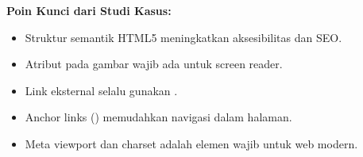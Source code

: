 \begin{catatan}
\textbf{Poin Kunci dari Studi Kasus:}
\begin{itemize}[leftmargin=*]
  \item Struktur semantik HTML5 meningkatkan aksesibilitas dan SEO.
  \item Atribut  pada gambar wajib ada untuk screen reader.
  \item Link eksternal selalu gunakan .
  \item Anchor links () memudahkan navigasi dalam halaman.
  \item Meta viewport dan charset adalah elemen wajib untuk web modern.
\end{itemize}
\end{catatan}

